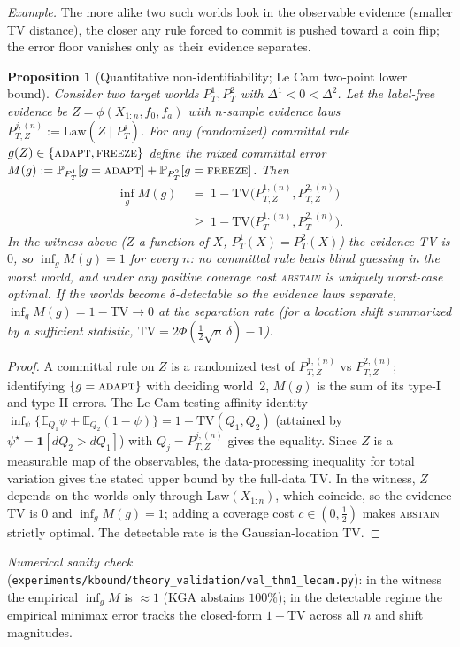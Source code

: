 \documentclass[conference]{IEEEtran}
\theoremstyle{plain}
\newtheorem{proposition}{Proposition}
\theoremstyle{definition}
\newcommand{\E}{\mathbb{E}}
\renewcommand{\Pr}{\mathbb{P}}
\newcommand{\TV}{\mathrm{TV}}
\newcommand{\Law}{\mathrm{Law}}
\begin{document}
\noindent\emph{Example.} The more alike two such worlds look in the observable evidence (smaller
TV distance), the closer any rule forced to commit is pushed toward a coin flip; the error floor
vanishes only as their evidence separates.
\begin{proposition}[Quantitative non-identifiability; Le Cam two-point lower bound]
\label{thm:imp-quant}
Consider two target worlds $P_T^1,P_T^2$ with $\Delta^1<0<\Delta^2$. Let the
label-free evidence be $Z=\phi(X_{1:n},f_0,f_a)$ with $n$-sample evidence laws
$P_{T,Z}^{j,(n)}:=\Law(Z\mid P_T^j)$. For any (randomized) committal rule
$g(Z)\in\{\textsc{adapt},\textsc{freeze}\}$ define the mixed committal error
$M(g):=\Pr_{P_T^1}[g=\textsc{adapt}]+\Pr_{P_T^2}[g=\textsc{freeze}]$. Then
\[
\begin{aligned}
\inf_{g} M(g) &\;=\;1-\TV\!\big(P_{T,Z}^{1,(n)},P_{T,Z}^{2,(n)}\big)\\
&\;\ge\;1-\TV\!\big(P_T^{1,(n)},P_T^{2,(n)}\big).
\end{aligned}
\]
In the witness above ($Z$ a function of $X$, $P_T^1(X)=P_T^2(X)$) the evidence TV is
$0$, so $\inf_g M(g)=1$ for \emph{every} $n$: no committal rule beats blind guessing
in the worst world, and under any positive coverage cost \textsc{abstain} is uniquely
worst-case optimal. If the worlds become $\delta$-detectable so the evidence laws
separate, $\inf_g M(g)=1-\TV\to0$ at the separation rate (for a location shift summarized
by a sufficient statistic, $\TV=2\Phi(\tfrac12\sqrt n\,\delta)-1$).
\end{proposition}
\begin{proof}
A committal rule on $Z$ is a randomized test of $P_{T,Z}^{1,(n)}$ vs
$P_{T,Z}^{2,(n)}$; identifying $\{g=\textsc{adapt}\}$ with deciding world~2, $M(g)$ is
the sum of its type-I and type-II errors. The Le Cam testing-affinity identity
$\inf_\psi\{\E_{Q_1}\psi+\E_{Q_2}(1-\psi)\}=1-\TV(Q_1,Q_2)$ (attained by
$\psi^\star=\mathbf1[dQ_2>dQ_1]$) with $Q_j=P_{T,Z}^{j,(n)}$ gives the equality. Since
$Z$ is a measurable map of the observables, the data-processing inequality for total
variation gives the stated upper bound by the full-data TV. In the witness, $Z$ depends
on the worlds only through $\Law(X_{1:n})$, which coincide, so the evidence TV is $0$
and $\inf_g M(g)=1$; adding a coverage cost $c\in(0,\tfrac12)$ makes \textsc{abstain}
strictly optimal. The detectable rate is the Gaussian-location TV. \qedhere
\end{proof}
\noindent\emph{Numerical sanity check} (\texttt{experiments/kbound/theory\_validation/val\_thm1\_lecam.py}):
in the witness the empirical $\inf_g M$ is $\approx 1$ (KGA abstains $100\%$); in the
detectable regime the empirical minimax error tracks the closed-form $1-\TV$ across all
$n$ and shift magnitudes.
\end{document}
